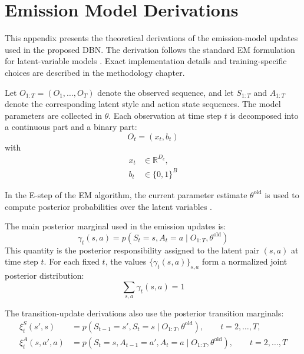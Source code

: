 \chapter{Emission Model Derivations}
\label{appendix:emission_updates}

This appendix presents the theoretical derivations of the emission-model updates used in the proposed \ac{DBN}. 
The derivation follows the standard \ac{EM} formulation for latent-variable models
\cite{Dempster1977,pml1Book}. Exact implementation details and training-specific choices are described in the methodology chapter.

Let \(O_{1:T}=(O_1,\dots,O_T)\) denote the observed sequence, and let
\(S_{1:T}\) and \(A_{1:T}\) denote the corresponding latent style and action
state sequences. The model parameters are collected in \(\theta\).
Each observation at time step \(t\) is decomposed into a continuous part and a binary part:
\begin{equation}
O_t = (x_t, b_t)
\end{equation}
with
\begin{align}
x_t &\in \mathbb{R}^{D_c}, \\
b_t &\in \{0,1\}^{B}
\end{align}


In the E-step of the \ac{EM} algorithm, the current parameter estimate
\(\theta^{\mathrm{old}}\) is used to compute posterior probabilities over the latent variables \cite{rabiner1989tutorial,murphy2002dynamic,pml1Book}.

The main posterior marginal used in the emission updates is:
\begin{equation}
\gamma_t(s,a)
=
p(S_t=s,A_t=a \mid O_{1:T},\theta^{\mathrm{old}})
\label{eq:gamma_joint_appendix}
\end{equation}
This quantity is the posterior responsibility assigned to the latent pair \((s,a)\) at time step \(t\). 
For each fixed \(t\), the values \(\{\gamma_t(s,a)\}_{s,a}\) form a normalized joint posterior distribution:
\begin{equation}
\sum_{s,a}\gamma_t(s,a)=1
\end{equation}

The transition-update derivations also use the posterior transition marginals:
\begin{align}
\xi_t^{S}(s',s)
&=
p(S_{t-1}=s',S_t=s \mid O_{1:T},\theta^{\mathrm{old}}),
\qquad t=2,\dots,T,
\label{eq:xi_style_appendix}
\\
\xi_t^{A}(s,a',a)
&=
p(S_t=s,A_{t-1}=a',A_t=a \mid O_{1:T},\theta^{\mathrm{old}}),
\qquad t=2,\dots,T
\label{eq:xi_action_appendix}
\end{align}



